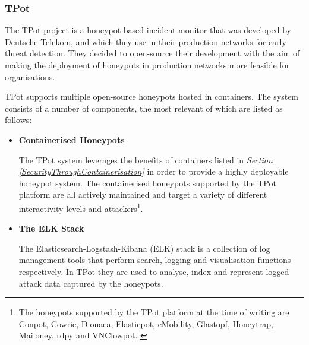  
    \subsubsection{TPot} \label{AboutTPot}
    The TPot project is a honeypot-based incident monitor that was developed by Deutsche Telekom, and which they use in their production networks for early threat detection. They decided to open-source their development with the aim of making the deployment of honeypots in production networks more feasible for organisations. \cite{TPotWebpagev17}
    
    TPot supports multiple open-source honeypots hosted in containers. The system consists of a number of components, the most relevant of which are listed as follows:
    \begin{itemize}
    \item \textbf{Containerised Honeypots}

	The TPot system leverages the benefits of containers listed in \textit{Section \ref{SecurityThroughContainerisation}} in order to provide a highly deployable honeypot system. The containerised honeypots supported by the TPot platform are all actively maintained and target a variety of different interactivity levels and attackers\footnote{The honeypots supported by the TPot platform at the time of writing are Conpot, Cowrie, Dionaea, Elasticpot, eMobility, Glastopf, Honeytrap, Mailoney, rdpy and VNClowpot. \cite{TPotWebpagev17}}.

        \item \textbf{The ELK Stack}
    
    The Elasticsearch-Logstash-Kibana (ELK) stack is a collection of log management tools that perform search, logging and visualisation functions respectively. In TPot they are used to analyse, index and represent logged attack data captured by the honeypots.

    \end{itemize}
    
